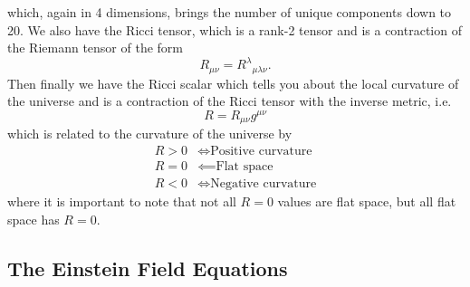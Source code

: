 \documentclass[12pt]{article}
\numberwithin{equation}{section}
\numberwithin{figure}{section}
\begin{document}
which, again in 4 dimensions, brings the number of unique components down to 20.
We also have the Ricci tensor, which is a rank-2 tensor and is a contraction of the Riemann tensor of the form
\begin{equation}
	R_{\mu\nu} = {R^\lambda}_{\mu\lambda\nu}. \label{eq:ricci}
\end{equation}
Then finally we have the Ricci scalar which tells you about the local curvature of the universe and is a contraction of the Ricci tensor with the inverse metric, i.e.
\begin{equation}
	R = R_{\mu\nu}g^{\mu\nu} \label{eq:ricscalar}
\end{equation}
which is related to the curvature of the universe by
\begin{align}
R > 0 &\iff \text{Positive curvature}\\
R = 0 &\impliedby \text{Flat space}\\
R < 0 &\iff \text{Negative curvature}
\end{align}
where it is important to note that not all $R=0$ values are flat space, but all flat space has $R=0$.
\subsection{The Einstein Field Equations} %
\label{sub:The_einstein_field_equations}
%
%
%
\end{document}
